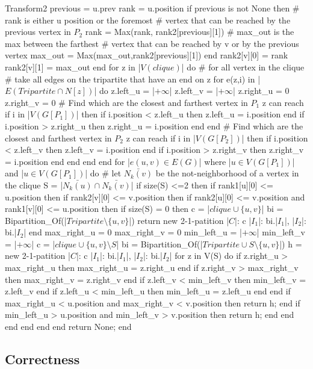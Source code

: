 \begin{code}{Transform2}
    previous = u.prev
    rank = u.position
    if previous is not None then
      # rank is either u position or the foremost 
      # vertex that can be reached by the previous vertex in $P_2$
      rank = Max(rank, rank2[previous][1]) 
      # max_out is the max between the farthest
      # vertex that can be reached by v or by the previous vertex
      max_out = Max(max_out,rank2[previous][1])  
    end
    rank2[v][0] = rank
    rank2[v][1] = max_out
  end
  for z in |$V(clique)$| do # for all vertex in the clique
    # take all edges on the tripartite that have an end on z
    for e(z,i) in |$E(Tripartite \cap N[z])$| do 
      z.left_u = |$+\infty$|
      z.left_v = |$+\infty$|
      z.right_u = 0
      z.right_v = 0
      # Find which are the closest and farthest vertex in $P_1$ z can reach
      if i in |$V(G[P_1])$| then 
        if i.position < z.left_u then
          z.left_u = i.position
        end
        if i.position > z.right_u then
          z.right_u = i.position
        end
      end
      # Find which are the closest and farthest vertex in $P_2$ z can reach
      if i in |$V(G[P_2])$| then 
        if i.position < z.left_v then
          z.left_v = i.position
        end
        if i.position > z.right_v then
          z.right_v = i.position
        end
      end  
    end
  end
  for |$e(u,v) \in E(G)$| where |$u \in V(G[P_1])$| and |$u \in V(G[P_1])$| do
    # let $\bar{N_k(v)}$ be the not-neighborhood of a vertex in the clique
    S = |$\bar{N_k(u)} \cap \bar{N_k(v)}$|
    if size(S) <=2 then
     if rank1[u][0] <= u.position then
       if rank2[v][0] <= v.position then
         if rank2[u][0] <= v.position and rank1[v][0] <= u.position then
           if size(S) = 0 then
             c = |$clique \cup \{u,v\}$|
             bi = Bipartition_Of(|$Tripartite \setminus \{u,v\}$|)
             return new 2-1-patition{
               |$C$|: c
               |$I_1$|: bi.|$I_1$|,
               |$I_2$|: bi.|$I_2$|
             }
           end
           max_right_u = 0
           max_right_v = 0
           min_left_u = |$+\infty$|
           min_left_v = |$+\infty$|
           c = |$clique \cup \{u,v\} \setminus S$|
           bi = Bipartition_Of(|$Tripartite \cup S \setminus \{u,v\}$|)
           h = new 2-1-patition{
               |$C$|: c
               |$I_1$|: bi.|$I_1$|,
               |$I_2$|: bi.|$I_2$|
             }
           for z in V(S) do
            if z.right_u > max_right_u then
              max_right_u = z.right_u
            end
            if z.right_v > max_right_v then
              max_right_v = z.right_v
            end
            if z.left_v < min_left_v then
              min_left_v = z.left_v
            end
            if z.left_u < min_left_u then
              min_left_u = z.left_u
            end
           end
           if max_right_u < u.position and max_right_v < v.position then
             return h;
           end
           if min_left_u > u.position and min_left_v > v.position then
             return h;
           end
         end
       end
     end
    end    
  end
  return None;
end
\end{code}

\subsection{Correctness}
